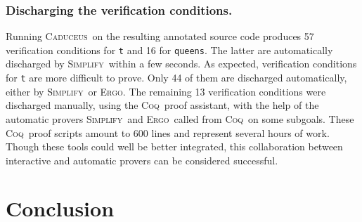 \documentclass[a4paper]{llncs}
\newcommand{\caduceus}{\textsc{Caduceus}}
\newcommand{\simplify}{\textsc{Simplify}}
\newcommand{\ergo}{\textsc{Ergo}}
\newcommand{\coq}{\textsc{Coq}}
\begin{document}
\subsubsection{Discharging the verification conditions.}
Running \caduceus\ on the resulting annotated source code produces
57 verification conditions for \texttt{t} and 16 for
\texttt{queens}. The latter are
automatically discharged by \simplify\ within a few seconds.
As expected, verification conditions for \texttt{t} are more difficult
to prove. Only 44 of them are
discharged automatically, either by \simplify\ or \ergo.
The remaining 13 verification conditions were discharged manually,
using the \coq\ proof assistant, with the help of the automatic provers
\simplify\ and \ergo\ called from \coq\ on some subgoals. These \coq\
proof scripts amount to 600 lines and represent several hours of
work. Though these tools could well be better integrated, this
collaboration between interactive and automatic provers can be
considered successful.

\section{Conclusion}\label{conclu}
\end{document}
